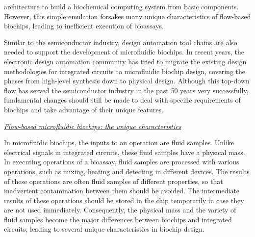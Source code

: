     
    architecture 
to build a biochemical computing system from basic components. %
However, this simple emulation forsakes many unique characteristics of
flow-based biochips, 
leading to inefficient execution of bioassays.

Similar to the semiconductor industry, design automation tool chains are also needed to 
support the 
development
of microfluidic biochips. In recent years,
the electronic design automation community has tried to migrate the existing
design methodologies for integrated circuits to 
microfluidic biochip design, covering the phases from 
high-level synthesis down to physical design. 
Although this top-down flow has served the semiconductor industry in the past 50 years
very successfully, fundamental changes should still be made to deal with 
specific requirements of biochips and take advantage of their unique
features.
 

\vskip 8pt
\textit{\underline{Flow-based microfluidic biochips: the unique
characteristics}}

In microfluidic biochips, the inputs to an operation are fluid samples. 
Unlike electrical signals in integrated circuits, these fluid samples 
have a physical mass.  
In executing operations of a bioassay, 
fluid samples are processed with various operations, 
such as mixing, heating and detecting in different devices. 
The results of these operations are often fluid samples of different
properties, so that inadvertent contamination between them should be avoided. 
The intermediate
results of these operations should be stored in the chip temporarily in case
they are not used immediately.
Consequently, the physical mass and the variety of fluid samples 
become the major differences between biochips and 
integrated circuits, leading to several unique
characteristics in biochip design.

